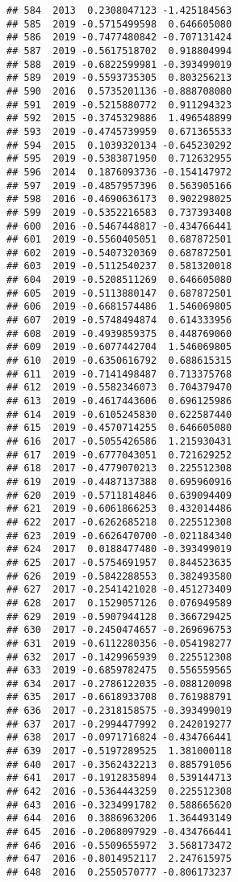 \documentclass[
]{article}
\begin{document}
\begin{verbatim}
## 584  2013  0.2308047123 -1.425184563
## 585  2019 -0.5715499598  0.646605080
## 586  2019 -0.7477480842 -0.707131424
## 587  2019 -0.5617518702  0.918804994
## 588  2019 -0.6822599981 -0.393499019
## 589  2019 -0.5593735305  0.803256213
## 590  2016  0.5735201136 -0.888708080
## 591  2019 -0.5215880772  0.911294323
## 592  2015 -0.3745329886  1.496548899
## 593  2019 -0.4745739959  0.671365533
## 594  2015  0.1039320134 -0.645230292
## 595  2019 -0.5383871950  0.712632955
## 596  2014  0.1876093736 -0.154147972
## 597  2019 -0.4857957396  0.563905166
## 598  2016 -0.4690636173  0.902298025
## 599  2019 -0.5352216583  0.737393408
## 600  2016 -0.5467448817 -0.434766441
## 601  2019 -0.5560405051  0.687872501
## 602  2019 -0.5407320369  0.687872501
## 603  2019 -0.5112540237  0.581320018
## 604  2019 -0.5208511269  0.646605080
## 605  2019 -0.5113880147  0.687872501
## 606  2019 -0.6681574486  1.546069805
## 607  2019 -0.5748494874  0.614333956
## 608  2019 -0.4939859375  0.448769060
## 609  2019 -0.6077442704  1.546069805
## 610  2019 -0.6350616792  0.688615315
## 611  2019 -0.7141498487  0.713375768
## 612  2019 -0.5582346073  0.704379470
## 613  2019 -0.4617443606  0.696125986
## 614  2019 -0.6105245830  0.622587440
## 615  2019 -0.4570714255  0.646605080
## 616  2017 -0.5055426586  1.215930431
## 617  2019 -0.6777043051  0.721629252
## 618  2017 -0.4779070213  0.225512308
## 619  2019 -0.4487137388  0.695960916
## 620  2019 -0.5711814846  0.639094409
## 621  2019 -0.6061866253  0.432014486
## 622  2017 -0.6262685218  0.225512308
## 623  2019 -0.6626470700 -0.021184340
## 624  2017  0.0188477480 -0.393499019
## 625  2017 -0.5754691957  0.844523635
## 626  2019 -0.5842288553  0.382493580
## 627  2017 -0.2541421028 -0.451273409
## 628  2017  0.1529057126  0.076949589
## 629  2019 -0.5907944128  0.366729425
## 630  2017 -0.2450474657 -0.269696753
## 631  2019 -0.6112280356 -0.054198277
## 632  2017 -0.1429965939  0.225512308
## 633  2019 -0.6859782475  0.556559565
## 634  2017 -0.2786122035 -0.088120098
## 635  2017 -0.6618933708  0.761988791
## 636  2017 -0.2318158575 -0.393499019
## 637  2017 -0.2994477992  0.242019277
## 638  2017 -0.0971716824 -0.434766441
## 639  2017 -0.5197289525  1.381000118
## 640  2017 -0.3562432213  0.885791056
## 641  2017 -0.1912835894  0.539144713
## 642  2016 -0.5364443259  0.225512308
## 643  2016 -0.3234991782  0.588665620
## 644  2016  0.3886963206  1.364493149
## 645  2016 -0.2068097929 -0.434766441
## 646  2016 -0.5509655972  3.568173472
## 647  2016 -0.8014952117  2.247615975
## 648  2016  0.2550570777 -0.806173237

\end{verbatim}
\end{document}
